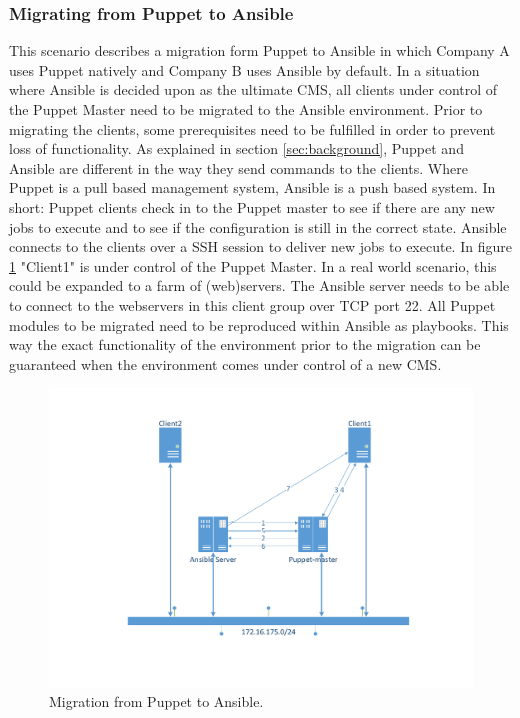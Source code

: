 \subsubsection{Migrating from Puppet to Ansible}\label{subsec:Puppettoansible}
This scenario describes a migration form Puppet to Ansible in which Company A uses Puppet natively and Company B uses Ansible by default. In a situation where Ansible is decided upon as the ultimate CMS, all clients under control of the Puppet Master need to be migrated to the Ansible environment. Prior to migrating the clients, some prerequisites need to be fulfilled in order to prevent loss of functionality. As explained in section \ref{sec:background}, Puppet and Ansible are different in the way they send commands to the clients. Where Puppet is a pull based management system, Ansible is a push based system. In short: Puppet clients check in to the Puppet master to see if there are any new jobs to execute and to see if the configuration is still in the correct state. Ansible connects to the clients over a SSH session to deliver new jobs to execute. In figure \ref{fig:situation1} "Client1" is under control of the Puppet Master. In a real world scenario, this could be expanded to a farm of (web)servers. The Ansible server needs to be able to connect to the webservers in this client group over TCP port 22. All Puppet modules to be migrated need to be reproduced within Ansible as playbooks. This way the exact functionality of the environment prior to the migration can be guaranteed when the environment comes under control of a new CMS.

\begin{figure}[!ht]
        \includegraphics[scale=0.5]{img/PuppettoAnsible.pdf}     
        \caption{Migration from Puppet to Ansible.}
        \label{fig:situation1}
\end{figure}

